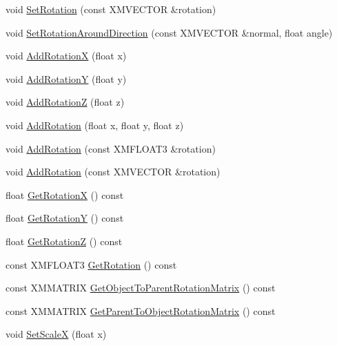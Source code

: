 \begin{DoxyCompactItemize}
\item 
void \hyperlink{classmage_1_1_transform_node_a28a438e0170bacc82c8426f167dac6e4}{Set\+Rotation} (const X\+M\+V\+E\+C\+T\+OR \&rotation)
\item 
void \hyperlink{classmage_1_1_transform_node_a36661d441998e1db4ada5f7c8f34155b}{Set\+Rotation\+Around\+Direction} (const X\+M\+V\+E\+C\+T\+OR \&normal, float angle)
\item 
void \hyperlink{classmage_1_1_transform_node_a149a1873d1496075e5f227b686343e5c}{Add\+RotationX} (float x)
\item 
void \hyperlink{classmage_1_1_transform_node_a23af3e48d4d330678199773eb5343215}{Add\+RotationY} (float y)
\item 
void \hyperlink{classmage_1_1_transform_node_acd425b01721efb584c43840cd41486fb}{Add\+RotationZ} (float z)
\item 
void \hyperlink{classmage_1_1_transform_node_ab916a99f686d7a6cab72892668039ec7}{Add\+Rotation} (float x, float y, float z)
\item 
void \hyperlink{classmage_1_1_transform_node_a15d15c00f2e43282d6bcb70cbad3027b}{Add\+Rotation} (const X\+M\+F\+L\+O\+A\+T3 \&rotation)
\item 
void \hyperlink{classmage_1_1_transform_node_ad153cec9663261a3c8cf37a84ebd7082}{Add\+Rotation} (const X\+M\+V\+E\+C\+T\+OR \&rotation)
\item 
float \hyperlink{classmage_1_1_transform_node_a2b3d032c45a0de8d128db83664d85111}{Get\+RotationX} () const
\item 
float \hyperlink{classmage_1_1_transform_node_ab8e8e698297793281a7c880bdcde3880}{Get\+RotationY} () const
\item 
float \hyperlink{classmage_1_1_transform_node_a7cbb269851eb512b19d3b1c0004d7148}{Get\+RotationZ} () const
\item 
const X\+M\+F\+L\+O\+A\+T3 \hyperlink{classmage_1_1_transform_node_a59853c7e8a8cd049a8e6362986204409}{Get\+Rotation} () const
\item 
const X\+M\+M\+A\+T\+R\+IX \hyperlink{classmage_1_1_transform_node_ae72c1a89c45d21458e897522b0ae6842}{Get\+Object\+To\+Parent\+Rotation\+Matrix} () const
\item 
const X\+M\+M\+A\+T\+R\+IX \hyperlink{classmage_1_1_transform_node_ad1dd1aa5ce60b32fe4481c072891fe95}{Get\+Parent\+To\+Object\+Rotation\+Matrix} () const
\item 
void \hyperlink{classmage_1_1_transform_node_a17e426c971866a68355a6fdde3265b41}{Set\+ScaleX} (float x)
\item 

\end{DoxyCompactItemize}
